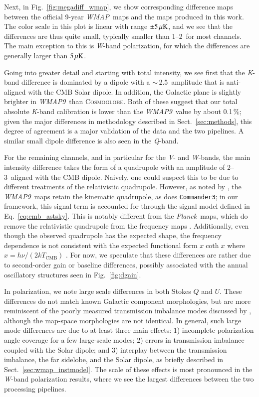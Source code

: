 \documentclass[twocolumn]{../../common/aa}
\def\WMAP{\emph{WMAP}}
\def\WMAPnine{\emph{WMAP9}}
\def\Planck{\emph{Planck}}
\def\commanderthree{\texttt{Commander3}}
\newcommand{\cosmoglobe}{\textsc{Cosmoglobe}}
\newcommand{\K}[0]{\textit K}
\newcommand{\Q}[0]{\textit Q}
\newcommand{\V}[0]{\textit V}
\newcommand{\W}[0]{\textit W}
\begin{document}
Next, in Fig.~\ref{fig:megadiff_wmap}, we show corresponding difference maps between the official 9-year \WMAP\ maps and the maps produced in this work. The color scale in this plot is linear with range $\pm5\muK$, and we see that the differences are thus quite small, typically smaller than 1--2\muK\ for most channels. The main exception to this is \W-band polarization, for which the differences are generally larger than $5\muK$.

Going into greater detail and starting with total intensity, we see first that the \K-band difference is dominated by a dipole with a $\sim$\,2.5\muK\ amplitude that is anti-aligned with the CMB Solar dipole. In addition, the Galactic plane is slightly brighter in \WMAPnine\ than \cosmoglobe. Both of these suggest that our total absolute \K-band calibration is lower than the \WMAPnine\ value by about 0.1\,\%; given the major differences in methodology described in Sect.~\ref{sec:methods}, this degree of agreement is a major validation of the data and the two  pipelines. A similar small dipole difference is also seen in the \Q-band.

For the remaining channels, and in particular for the \V- and \W-bands, the main intensity difference takes the form of a quadrupole with an amplitude of 2--3\muK\ aligned with the CMB dipole. Naively, one could suspect this to be due to different treatments of the relativistic quadrupole. However, as noted by \citet{larson2014}, the \WMAPnine\ maps retain the kinematic quadrupole, as does \commanderthree; in our framework, this signal term is accounted for through the signal model defined in Eq.~\eqref{eq:cmb_astsky}. This is notably different from the \Planck\ maps, which do remove the relativistic quadrupole from the frequency maps \citep{planck2016-l02,planck2016-l03}. Additionally, even though the observed quadrupole has the expected shape, the frequency dependence is not consistent with the expected functional form $x\coth x$ where $x=h\nu/(2kT_\mathrm{CMB})$ \citep{Notari:2015}. For now, we speculate that these differences are rather due to second-order gain or baseline differences, possibly associated with the annual oscillatory structures seen in Fig.~\ref{fig:dgain}.

In polarization, we note large scale differences in both Stokes $Q$ and $U$. These differences do not match known Galactic component morphologies, but are more reminiscent of the poorly measured transmission imbalance modes discussed by \citet{jarosik2010}, although the map-space morphologies are not identical. In general, such large mode differences are due to at least three main effects: 1) incomplete polarization angle coverage for a few large-scale modes; 2) errors in transmission imbalance coupled with the Solar dipole; and 3) interplay between the transmission imbalance, the far sidelobe, and the Solar dipole, as briefly described in Sect.~\ref{sec:wmap_instmodel}. The scale of these effects is most pronounced in the \W-band polarization results, where we see the largest differences between the two processing pipelines.
\end{document}
